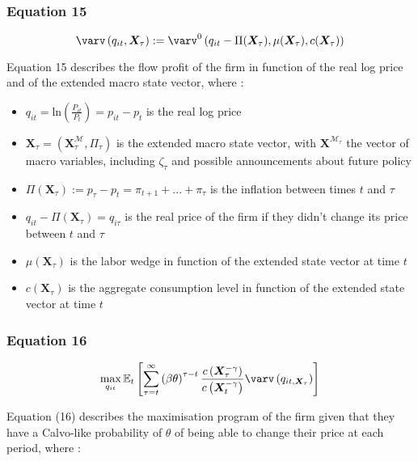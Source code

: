 \documentclass{article}
\begin{document}
\subsubsection*{Equation 15}
\begin{equation}
    \varv\left(q_{it},\bm{X}_{\tau}\right):=\varv^{0}\left(q_{it}-\Pi(\bm{X}_{\tau}),\mu(\bm{X}_{\tau}),c(\bm{X}_{\tau})\right)
\end{equation}

Equation 15 describes the flow profit of the firm in function of the real log price and of the extended macro state vector, where : 
\begin{itemize}
    \item $q_{it}=\text{ln}\left(\frac{P_{it}}{P_{t}}\right)=p_{it}-p_{t}$ is the real log price
    \item $\bm{X}_{\tau}=(\bm{X}^{\mathcal{M}}_{\tau}, \Pi_{\tau})$ is the extended macro state vector, with $\bm{X}^{\mathcal{M}_{\tau}}$ the vector of macro variables, including $\zeta_{\tau}$ and possible announcements about future policy
    \item $\Pi\left(\bm{X}_{\tau}\right):=p_{\tau}-p_{t}=\pi_{t+1}+...+\pi_{\tau}$ is the inflation between times $t$ and $\tau$
    \item $q_{it}-\Pi(\bm{X}_{\tau})=q_{i\tau}$ is the real price of the firm if they didn't change its price between $t$ and $\tau$
    \item $\mu\left(\bm{X}_{\tau}\right)$ is the labor wedge in function of the extended state vector at time $t$
    \item $c(\bm{X}_{\tau})$ is the aggregate consumption level in function of the extended state vector at time $t$
\end{itemize}

\subsubsection*{Equation 16}

\begin{equation}
    \max_{q_{it}}{\mathbb{E}_{t}\left[ \sum_{\tau=t}^{\infty}\left(\beta\theta\right)^{\tau-t}\frac{c\left(\bm{X}_{\tau}^{-\gamma}\right)}{c\left(\bm{X}_{t}^{-\gamma}\right)}\varv\left(q_{it,\bm{X}_{\tau}}\right)\right] }
\end{equation}

Equation (16) describes the maximisation program of the firm given that they have a Calvo-like probability of $\theta$ of being able to change their price at each period, where : 
\end{document}
